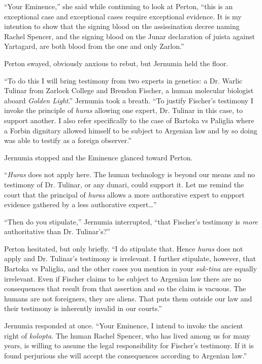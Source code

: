 
``Your Eminence,'' she said while continuing to look at Perton, ``this is an exceptional case
and exceptional cases require exceptional evidence. It is my intention to show that the signing
blood on the assissination decree naming Rachel Spencer, and the signing blood on the Junar
declaration of juista against Yartagard, are both blood from the one and only Zarlon.''

Perton swayed, obviously anxious to rebut, but Jernumia held the floor.

``To do this I will bring testimony from two experts in genetics: a Dr. Warlic Tulinar from
Zarlock College and Brendon Fischer, a human molecular biologist aboard \textit{Golden Light}.''
Jernumia took a breath. ``To justify Fischer's testimony I invoke the principle of
\textit{huras} allowing one expert, Dr. Tulinar in this case, to support another. I also refer
specifically to the case of Bartoka vs Paliglia where a Forbin dignitary allowed himself to be
subject to Argenian law and by so doing was able to testify as a foreign observer.''

Jernumia stopped and the Eminence glanced toward Perton.

``\textit{Huras} does not apply here. The human technology is beyond our means and no testimony
of Dr. Tulinar, or any dunari, could support it. Let me remind the court that the principal of
\textit{huras} allows a more authorative expert to support evidence gathered by a less
authorative expert\ldots''

``Then do you stipulate,'' Jernumia interrupted, ``that Fischer's testimony is \emph{more}
authoritative than Dr. Tulinar's?''

Perton hesitated, but only briefly. ``I do stipulate that. Hence \textit{huras} does not apply
and Dr. Tulinar's testimony is irrelevant. I further stipulate, however, that Bartoka vs
Paliglia, and the other cases you mention in your \textit{suk-tina} are equally irrelevant. Even
if Fischer claims to be subject to Argenian law there are no consequences that result from that
assertion and so the claim is vacuous. The humans are not foreigners, they are aliens. That puts
them outside our law and their testimony is inherently invalid in our courts.''

Jernumia responded at once. ``Your Eminence, I intend to invoke the ancient right of
\textit{kolopta}. The human Rachel Spencer, who has lived among us for many years, is willing to
assume the legal responsibility for Fischer's testimony. If it is found perjurious she will
accept the consequences according to Argenian law.''

